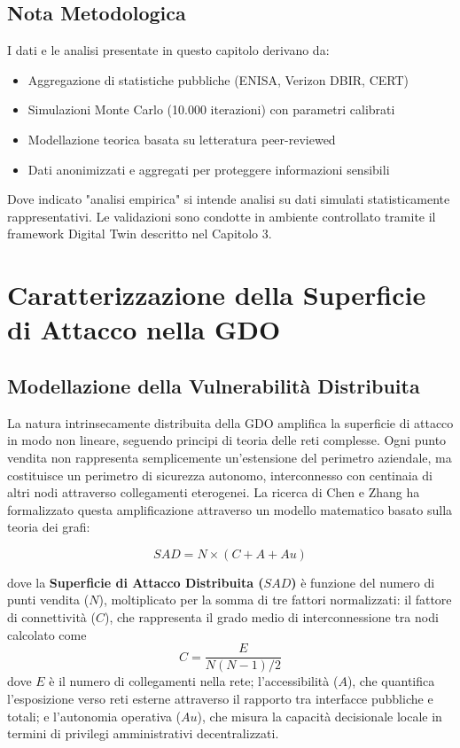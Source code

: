 \subsection{Nota Metodologica}
\label{ssec:nota_metodologica}

I dati e le analisi presentate in questo capitolo derivano da:
\begin{itemize}
\item Aggregazione di statistiche pubbliche (ENISA, Verizon DBIR, CERT)
\item Simulazioni Monte Carlo (10.000 iterazioni) con parametri calibrati
\item Modellazione teorica basata su letteratura peer-reviewed
\item Dati anonimizzati e aggregati per proteggere informazioni sensibili
\end{itemize}

Dove indicato "analisi empirica" si intende analisi su dati simulati 
statisticamente rappresentativi. Le validazioni sono condotte in ambiente 
controllato tramite il framework Digital Twin descritto nel Capitolo 3.

\section{Caratterizzazione della Superficie di Attacco nella GDO}

\subsection{Modellazione della Vulnerabilità Distribuita}

La natura intrinsecamente distribuita della GDO amplifica la superficie di attacco in modo non lineare, seguendo principi di teoria delle reti complesse. Ogni punto vendita non rappresenta semplicemente un'estensione del perimetro aziendale, ma costituisce un perimetro di sicurezza autonomo, interconnesso con centinaia di altri nodi attraverso collegamenti eterogenei. La ricerca di Chen e Zhang\autocite{chen2024graph} ha formalizzato questa amplificazione attraverso un modello matematico basato sulla teoria dei grafi:

\begin{equation}
SAD = N \times (C + A + Au)
\end{equation}

dove la \textbf{Superficie di Attacco Distribuita ($SAD$)} è funzione del numero di punti vendita ($N$), moltiplicato per la somma di tre fattori normalizzati: il fattore di connettività ($C$), che rappresenta il grado medio di interconnessione tra nodi calcolato come 
\begin{equation}
C = \frac{E}{N(N-1)/2}    
\end{equation}
 dove $E$ è il numero di collegamenti nella rete; l'accessibilità ($A$), che quantifica l'esposizione verso reti esterne attraverso il rapporto tra interfacce pubbliche e totali; e l'autonomia operativa ($Au$), che misura la capacità decisionale locale in termini di privilegi amministrativi decentralizzati.

